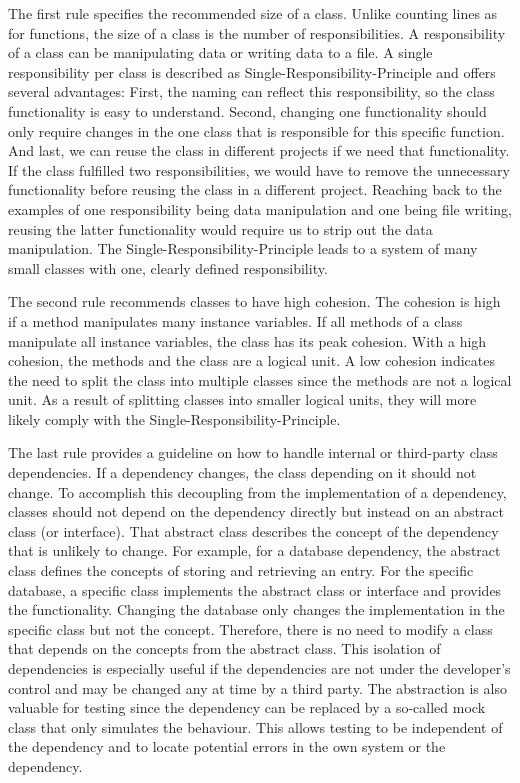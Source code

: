 The first rule specifies the recommended size of a class. Unlike counting lines as for functions, the size of a class is the number of responsibilities. A responsibility of a class can be manipulating data or writing data to a file. A single responsibility per class is described as Single-Responsibility-Principle and offers several advantages: First, the naming can reflect this responsibility, so the class functionality is easy to understand.
Second, changing one functionality should only require changes in the one class that is responsible for this specific function. And last, we can reuse the class in different projects if we need that functionality. If the class fulfilled two responsibilities, we would have to remove the unnecessary functionality before reusing the class in a different project. Reaching back to the examples of one responsibility being data manipulation and one being file writing, reusing the latter functionality would require us to strip out the data manipulation.
The Single-Responsibility-Principle leads to a system of many small classes with one, clearly defined responsibility.

The second rule recommends classes to have high cohesion. The cohesion is high if a method manipulates many instance variables. If all methods of a class manipulate all instance variables, the class has its peak cohesion. With a high cohesion, the methods and the class are a logical unit. A low cohesion indicates the need to split the class into multiple classes since the methods are not a logical unit. As a result of splitting classes into smaller logical units, they will more likely comply with the Single-Responsibility-Principle.

The last rule provides a guideline on how to handle internal or third-party class dependencies. If a dependency changes, the class depending on it should not change. To accomplish this decoupling from the implementation of a dependency, classes should not depend on the dependency directly but instead on an abstract class (or interface). That abstract class describes the concept of the dependency that is unlikely to change. For example, for a database dependency, the abstract class defines the concepts of storing and retrieving an entry. For the specific database, a specific class implements the abstract class or interface and provides the functionality. Changing the database only changes the implementation in the specific class but not the concept. Therefore, there is no need to modify a class that depends on the concepts from the abstract class. This isolation of dependencies is especially useful if the dependencies are not under the developer's control and may be changed any at time by a third party. The abstraction is also valuable for testing since the dependency can be replaced by a so-called mock class that only simulates the behaviour. This allows testing to be independent of the dependency and to locate potential errors in the own system or the dependency.

